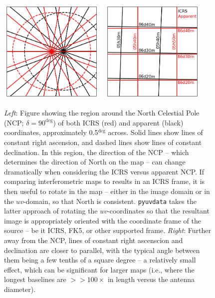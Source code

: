 \documentclass[11pt, oneside]{article}
\begin{document}
\begin{figure}[!t]
    \centering
    \includegraphics[width=0.45\textwidth]{ncp_icrs_app.png}
    \ 
    \includegraphics[width=0.45\textwidth]{app_icrs_frame_comp.png}
    \caption{\emph{Left}: Figure showing the region around the North Celestial Pole (NCP; $\delta=90^{\deg}$) of both ICRS (red) and apparent (black) coordinates, approximately 0.5$^{\deg}$ across. Solid lines show lines of constant right ascension, and dashed lines show lines of constant declination. In this region, the direction of the NCP -- which determines the direction of North on the map -- can change dramatically when considering the ICRS versus apparent NCP. If comparing interferometric maps to results in an ICRS frame, it is then useful to rotate in the map -- either in the image domain or in the $uv$-domain, so that North is consistent. \texttt{pyuvdata} takes the latter approach of rotating the $uv$-coordinates so that the resultant image is appropriately oriented with the coordinate frame of the source -- be it ICRS, FK5, or other supported frame. \emph{Right}: Further away from the NCP, lines of constant right ascenscion and declination are closer to parallel, with the typical angle between them being a few tenths of a square degree -- a relatively small effect, which can be significant for larger maps (i.e., where the longest baselines are $>> 100\times$ in length versus the antenna diameter).}
    \label{fig:coord_figures}
\end{figure}
\end{document}
